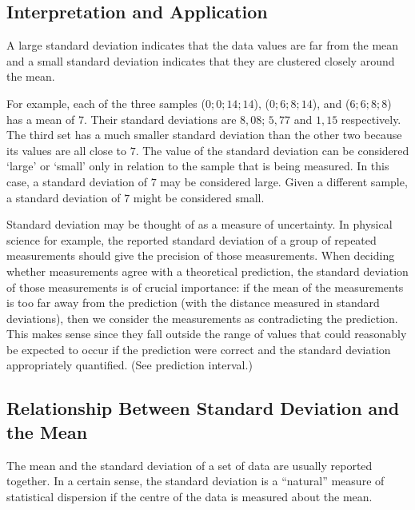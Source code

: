 \subsection{Interpretation and Application}

A large standard deviation indicates that the data values are far from the mean and a small standard deviation indicates that they are clustered closely around the mean.

For example, each of the three samples ($0; 0; 14; 14$), ($0; 6; 8; 14$), and ($6; 6; 8; 8$) has a mean of $7$. Their standard deviations are $8,08$; $5,77$ and $1,15$ respectively. The third set has a much smaller standard deviation than the other two because its values are all close to $7$. The value of the standard deviation can be considered `large' or `small' only in relation to the sample that is being measured. In this case, a standard deviation of $7$ may be considered large. Given a different sample, a standard deviation of $7$ might be considered small.

Standard deviation may be thought of as a measure of uncertainty. In physical science for example, the reported standard deviation of a group of repeated measurements should give the precision of those measurements. When deciding whether measurements agree with a theoretical prediction, the standard deviation of those measurements is of crucial importance: if the mean of the measurements is too far away from the prediction (with the distance measured in standard deviations), then we consider the measurements as contradicting the prediction. This makes sense since they fall outside the range of values that could reasonably be expected to occur if the prediction were correct and the standard deviation appropriately quantified. (See prediction interval.)

\subsection{Relationship Between Standard Deviation and the Mean}

The mean and the standard deviation of a set of data are usually reported together. In a certain sense, the standard deviation is a ``natural'' measure of statistical dispersion if the centre of the data is measured about the mean. 

